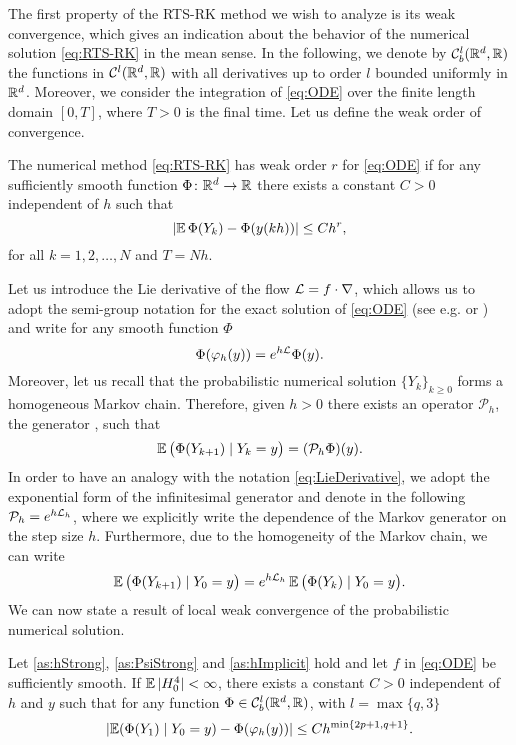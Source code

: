 \documentclass[10pt]{article}
\begin{document}
The first property of the RTS-RK method we wish to analyze is its weak convergence, which gives an indication about the behavior of the numerical solution \eqref{eq:RTS-RK} in the mean sense. In the following, we denote by $\mathcal C^l_b(\mathbb{R}^d, \mathbb{R})$ the functions in $\mathcal C^l(\mathbb{R}^d, \mathbb{R})$ with all derivatives up to order $l$ bounded uniformly in $\mathbb{R}^d$. Moreover, we consider the integration of \eqref{eq:ODE} over the finite length domain $[0,T]$, where $T > 0$ is the final time. Let us define the weak order of convergence. 
\begin{definition} The numerical method \eqref{eq:RTS-RK} has weak order $r$ for \eqref{eq:ODE} if for any sufficiently smooth function $\Phi\colon\mathbb{R}^d \to \mathbb{R}$ there exists a constant $C > 0$ independent of $h$ such that
	\begin{equation}
		\lvert\operatorname{\mathbb{E}}\Phi(Y_k) - \Phi(y(kh))\rvert \leq Ch^r,
	\end{equation}
	for all $k = 1, 2, \ldots, N$ and $T = Nh$.
\end{definition} 
Let us introduce the Lie derivative of the flow $\mathcal{L} = f \cdot \nabla$, which allows us to adopt the semi-group notation for the exact solution of \eqref{eq:ODE} (see e.g. \cite[Section III.5.1]{HLW06} or \cite[Section 4.3]{PaS08}) and write for any smooth function $\Phi$
\begin{equation}\label{eq:LieDerivative}
	\Phi(\varphi_h(y)) = e^{h\mathcal{L}} \Phi(y).
\end{equation}
Moreover, let us recall that the probabilistic numerical solution $\{Y_k\}_{k\geq 0}$ forms a homogeneous Markov chain. Therefore, given $h > 0$ there exists an operator $\mathcal{P}_h$, the generator \cite[Section 2.3]{Pav14}, such that
\begin{equation}
	\operatorname{\mathbb{E}} \big(\Phi(Y_{k+1})\mid Y_k = y\big) = (\mathcal{P}_h\Phi)(y).
\end{equation}
In order to have an analogy with the notation \eqref{eq:LieDerivative}, we adopt the exponential form of the infinitesimal generator and denote in the following $\mathcal{P}_h = e^{h\mathcal{L}_h}$, where we explicitly write the dependence of the Markov generator on the step size $h$. Furthermore, due to the homogeneity of the Markov chain, we can write
\begin{equation}\label{eq:MarkovProperty}
	\operatorname{\mathbb{E}} \big(\Phi(Y_{k+1})\mid Y_0 = y\big) = e^{h\mathcal{L}_h}\operatorname{\mathbb{E}} \big(\Phi(Y_k)\mid Y_0 = y\big).
\end{equation}
We can now state a result of local weak convergence of the probabilistic numerical solution.
\begin{lemma}\label{lem:WeakLocalOrder} Let \cref{as:hStrong}, \cref{as:PsiStrong} and \cref{as:hImplicit} hold and let $f$ in \eqref{eq:ODE} be sufficiently smooth. If $\operatorname{\mathbb{E}}|H_0^4| < \infty$, there exists a constant $C > 0$ independent of $h$ and $y$ such that for any function $\Phi\in \mathcal C^l_b(\mathbb{R}^d, \mathbb{R})$, with $l = \max\{q, 3\}$
	\begin{equation}       
		\lvert\operatorname{\mathbb{E}}(\Phi(Y_1)\mid Y_0 = y) - \Phi(\varphi_h(y))\rvert \leq C h^{\min\{2p+1, q+1\}}.
	\end{equation}
\end{lemma}
\end{document}
